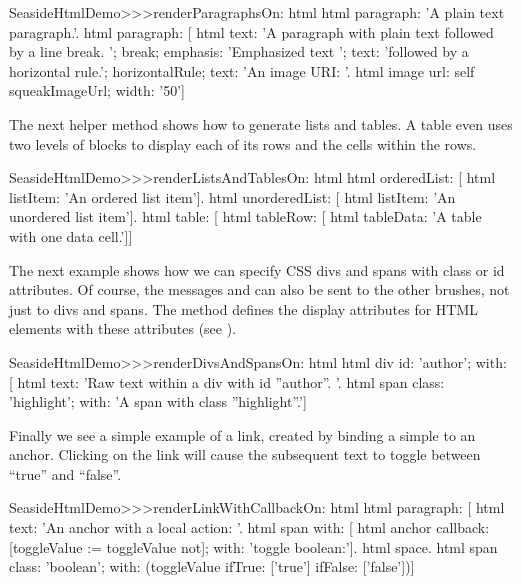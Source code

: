 \documentclass[a4paper,10pt,twoside]{book}
\begin{document}
\begin{code}{}
SeasideHtmlDemo>>>renderParagraphsOn: html 
	html paragraph: 'A plain text paragraph.'.
	html paragraph: [
		html
			text: 'A paragraph with plain text followed by a line break. ';
			break;
			emphasis: 'Emphasized text ';
			text: 'followed by a horizontal rule.';
			horizontalRule;
			text: 'An image URI: '.
		html image
			url: self squeakImageUrl;
			width: '50']
\end{code}

The next helper method shows how to generate lists and tables.
A table even uses two levels of blocks to display each of its rows and the cells within the rows.

\begin{code}{}
SeasideHtmlDemo>>>renderListsAndTablesOn: html 
	html orderedList: [
		html listItem: 'An ordered list item'].
	html unorderedList: [
		html listItem: 'An unordered list item'].
	html table: [
		html tableRow: [
			html tableData: 'A table with one data cell.']]
\end{code}

The next example shows how we can specify CSS divs and spans with class or id attributes.
Of course, the messages  and  can also be sent to the other brushes, not just to divs and spans.
The method  defines the display attributes for HTML elements with these attributes (see ).

\begin{code}{}
SeasideHtmlDemo>>>renderDivsAndSpansOn: html 
	html div
		id: 'author';
		with: [
			html text: 'Raw text within a div with id ''author''. '.
			html span
				class: 'highlight';
				with: 'A span with class ''highlight''.']
\end{code}

Finally we see a simple example of a link, created by binding a simple  to an anchor.
Clicking on the link will cause the subsequent text to toggle between ``true'' and ``false''.

\begin{code}{}
SeasideHtmlDemo>>>renderLinkWithCallbackOn: html 
	html paragraph: [
		html text: 'An anchor with a local action: '.
		html span with: [
			html anchor
				callback: [toggleValue := toggleValue not];
				with: 'toggle boolean:'].
		html space.
		html span
			class: 'boolean';
			with: (toggleValue ifTrue: ['true'] ifFalse: ['false'])]
\end{code}
\end{document}
